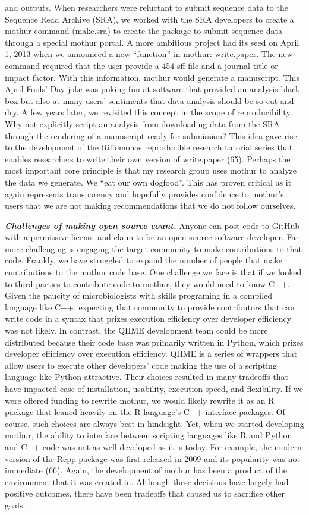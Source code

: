\documentclass[11pt,]{article}
\begin{document}
and outputs. When researchers were reluctant to submit sequence data to
the Sequence Read Archive (SRA), we worked with the SRA developers to
create a mothur command (make.sra) to create the package to submit
sequence data through a special mothur portal. A more ambitious project
had its seed on April 1, 2013 when we announced a new ``function'' in
mothur: write.paper. The new command required that the user provide a
454 sff file and a journal title or impact factor. With this
information, mothur would generate a manuscript. This April Fools' Day
joke was poking fun at software that provided an analysis black box but
also at many users' sentiments that data analysis should be so cut and
dry. A few years later, we revisited this concept in the scope of
reproducibility. Why not explicitly script an analysis from downloading
data from the SRA through the rendering of a manuscript ready for
submission? This idea gave rise to the development of the Riffomonas
reproducible research tutorial series that enables researchers to write
their own version of write.paper (65). Perhaps the most important core
principle is that my research group uses mothur to analyze the data we
generate. We ``eat our own dogfood''. This has proven critical as it
again represents transparency and hopefully provides confidence to
mothur's users that we are not making recommendations that we do not
follow ourselves.

\textbf{\emph{Challenges of making open source count.}} Anyone can post
code to GitHub with a permissive license and claim to be an open source
software developer. Far more challenging is engaging the target
community to make contributions to that code. Frankly, we have struggled
to expand the number of people that make contributions to the mothur
code base. One challenge we face is that if we looked to third parties
to contribute code to mothur, they would need to know C++. Given the
paucity of microbiologists with skills programing in a compiled language
like C++, expecting that community to provide contributors that can
write code in a syntax that prizes execution efficiency over developer
efficiency was not likely. In contrast, the QIIME development team could
be more distributed because their code base was primarily written in
Python, which prizes developer efficiency over execution efficiency.
QIIME is a series of wrappers that allow users to execute other
developers' code making the use of a scripting language like Python
attractive. Their choices resulted in many tradeoffs that have impacted
ease of installation, usability, execution speed, and flexibility. If we
were offered funding to rewrite mothur, we would likely rewrite it as an
R package that leaned heavily on the R language's C++ interface
packages. Of course, such choices are always best in hindsight. Yet,
when we started developing mothur, the ability to interface between
scripting languages like R and Python and C++ code was not as well
developed as it is today. For example, the modern version of the Rcpp
package was first released in 2009 and its popularity was not immediate
(66). Again, the development of mothur has been a product of the
environment that it was created in. Although these decisions have
largely had positive outcomes, there have been tradeoffs that caused us
to sacrifice other goals.
\end{document}
